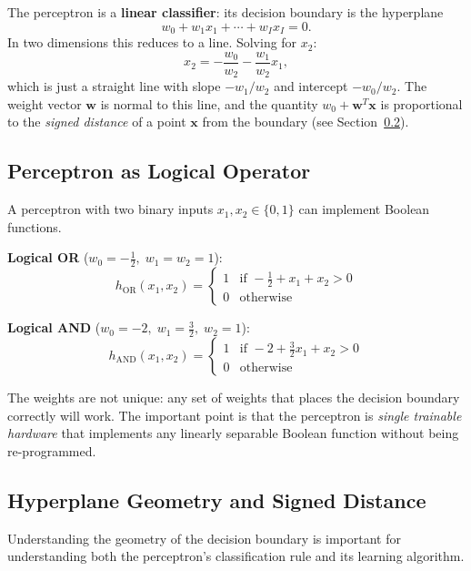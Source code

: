 \documentclass[11pt,a4paper]{article}
\newcommand{\term}[1]{\textcolor{DefGreen}{\textbf{#1}}\index{#1}}
\begin{document}
The perceptron is a \term{linear classifier}: its decision boundary is the hyperplane
\[
w_0 + w_1 x_1 + \cdots + w_I x_I = 0.
\]
In two dimensions this reduces to a line. Solving for $x_2$:
\[
x_2 = -\frac{w_0}{w_2} - \frac{w_1}{w_2} x_1,
\]
which is just a straight line with slope $-w_1/w_2$ and intercept $-w_0/w_2$. The weight vector $\mathbf{w}$ is normal to this line, and the quantity $w_0 + \mathbf{w}^T\mathbf{x}$ is proportional to the \emph{signed distance} of a point $\mathbf{x}$ from the boundary (see Section~\ref{sec:hyperplane}).

\subsection{Perceptron as Logical Operator}

A perceptron with two binary inputs $x_1, x_2 \in \{0,1\}$ can implement Boolean functions.

\textbf{Logical OR} ($w_0 = -\tfrac{1}{2},\; w_1 = w_2 = 1$):
\[
h_{\mathrm{OR}}(x_1, x_2) = \begin{cases} 1 & \text{if } -\tfrac{1}{2} + x_1 + x_2 > 0 \\ 0 & \text{otherwise} \end{cases}
\]

\textbf{Logical AND} ($w_0 = -2,\; w_1 = \tfrac{3}{2},\; w_2 = 1$):
\[
h_{\mathrm{AND}}(x_1, x_2) = \begin{cases} 1 & \text{if } -2 + \tfrac{3}{2}x_1 + x_2 > 0 \\ 0 & \text{otherwise} \end{cases}
\]

The weights are not unique: any set of weights that places the decision boundary correctly will work. The important point is that the perceptron is \emph{single trainable hardware} that implements any linearly separable Boolean function without being re-programmed.

\subsection{Hyperplane Geometry and Signed Distance}
\label{sec:hyperplane}

Understanding the geometry of the decision boundary is important for understanding both the perceptron's classification rule and its learning algorithm.
\end{document}
